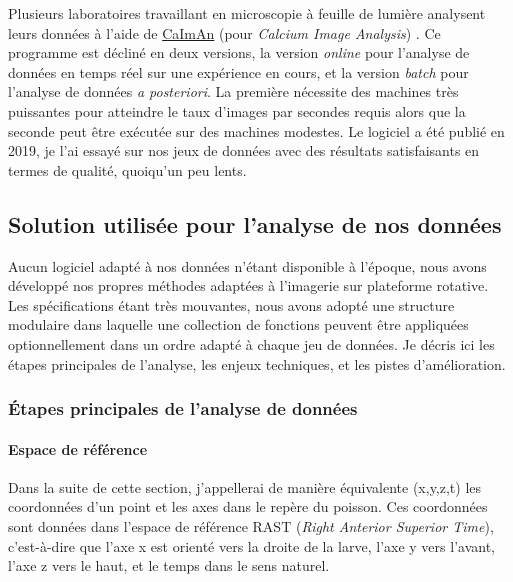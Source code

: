 Plusieurs laboratoires travaillant en microscopie à feuille de lumière analysent leurs données à l'aide de \href{https://github.com/flatironinstitute/CaImAn}{CaImAn} (pour \emph{Calcium Image Analysis}) \cite{giovannucci_caiman_2019}. Ce programme est décliné en deux versions, la version \emph{online} pour l'analyse de données en temps réel sur une expérience en cours, et la version \emph{batch} pour l'analyse de données \emph{a posteriori}. La première nécessite des machines très puissantes pour atteindre le taux d'images par secondes requis alors que la seconde peut être exécutée sur des machines modestes. Le logiciel a été publié en 2019, je l'ai essayé sur nos jeux de données avec des résultats satisfaisants en termes de qualité, quoiqu'un peu lents.

\subsection{Solution utilisée pour l'analyse de nos données}


Aucun logiciel adapté à nos données n'étant disponible à l'époque, nous avons développé nos propres méthodes adaptées à l'imagerie sur plateforme rotative. Les spécifications étant très mouvantes, nous avons adopté une structure modulaire dans laquelle une collection de fonctions peuvent être appliquées optionnellement dans un ordre adapté à chaque jeu de données. Je décris ici les étapes principales de l'analyse, les enjeux techniques, et les pistes d'amélioration.

\subsubsection{Étapes principales de l'analyse de données}

\paragraph{Espace de référence}

Dans la suite de cette section, j'appellerai de manière équivalente (x,y,z,t) les coordonnées d'un point et les axes dans le repère du poisson. Ces coordonnées sont données dans l'espace de référence RAST (\emph{Right Anterior Superior Time}), c'est-à-dire que l'axe x est orienté vers la droite de la larve, l'axe y vers l'avant, l'axe z vers le haut, et le temps dans le sens naturel.


